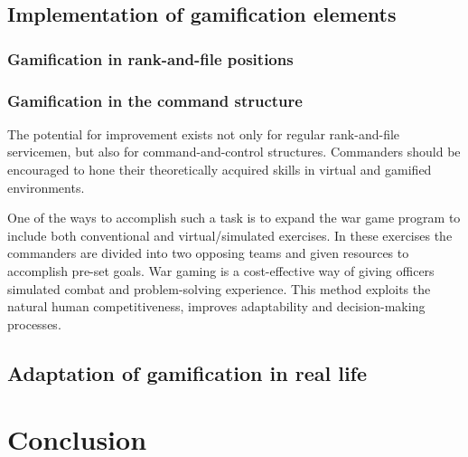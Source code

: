 \documentclass[10pt,twoside,slovak,a4paper]{article}
\begin{document}
\subsection{Implementation of gamification elements} \label{implementation}


\subsubsection{Gamification in rank-and-file positions} \label{rank-and-file}

\subsubsection{Gamification in the command structure} \label{command}

The potential for improvement exists not only for regular rank-and-file servicemen, but also for command-and-control structures. Commanders should be encouraged to hone their theoretically acquired skills in virtual and gamified environments. \par One of the ways to accomplish such a task is to expand the war game program to include both conventional and virtual/simulated exercises. In these exercises the commanders are divided into two opposing teams and given resources to accomplish pre-set goals. War gaming is a cost-effective way of giving officers simulated combat and problem-solving experience. This method exploits the natural human competitiveness, improves adaptability and decision-making processes\cite{fletcher2000overview}. 



\subsection{Adaptation of gamification in real life} \label{adaptation}

\section{Conclusion} \label{conclusion}




\end{document}

